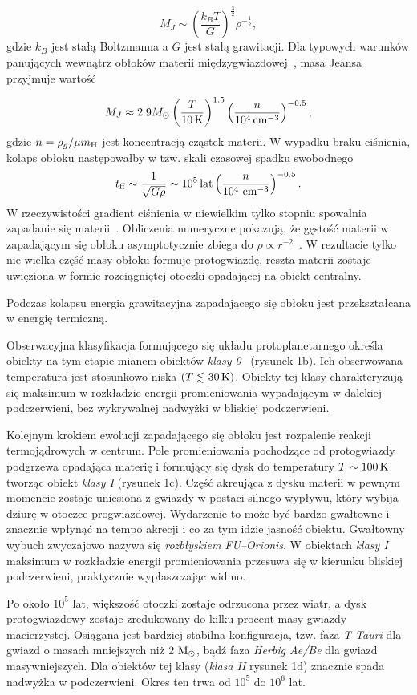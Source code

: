 \begin{equation} M_J \sim
   \left( \frac{k_B T}{G} \right) ^\frac{3}{2} {\rho}^{-\frac{1}{2}},
\end{equation} 
gdzie $k_B$ jest stałą Boltzmanna a $G$ jest stałą grawitacji.
Dla typowych warunków panujących wewnątrz obłoków materii
międzygwiazdowej~\cite{BM89}, masa Jeansa przyjmuje wartość

\begin{equation}
 M_J \approx 2.9 M_{\odot} \left(\frac{T}{10\hbox{$\thinspace\textrm{K}$}}\right)^{1.5} 
 \left(\frac{n}{10^4\hbox{$\thinspace\textrm{cm}$}^{-3}}\right)^{-0.5},
\end{equation}
gdzie $n = \rho_g / \mu \hbox{$m_{\textrm{H}}$}$ jest koncentracją cząstek materii.
W wypadku braku ciśnienia, kolaps obłoku następowałby w tzw. skali czasowej
spadku swobodnego~\cite{Spitzer1978}
\begin{equation}
   t_{\textrm{ff}} \sim \frac{1}{\sqrt{G\rho}} \sim 10^5\hbox{$\thinspace\textrm{lat}$}
   \left(\frac{n}{10^4\thinspace \hbox{$\thinspace\textrm{cm}$}^{-3}}\right)^{-0.5}.
\end{equation}
W rzeczywistości gradient ciśnienia w niewielkim tylko stopniu spowalnia
zapadanie się materii~\cite{T82}. Obliczenia numeryczne pokazują, że gęstość
materii w zapadającym się obłoku asymptotycznie zbiega do $\rho \propto
r^{-2}$~\cite{L69}. W rezultacie tylko nie wielka część masy obłoku formuje
protogwiazdę, reszta materii zostaje uwięziona w formie rozciągniętej otoczki
opadającej na obiekt centralny.

Podczas kolapsu energia grawitacyjna zapadającego się obłoku jest przekształcana
w energię termiczną.

Obserwacyjna klasyfikacja formującego się układu
protoplanetarnego określa obiekty na tym etapie mianem obiektów \emph{klasy
0}~\cite{andre} (rysunek 1b).  Ich obserwowana temperatura jest stosunkowo niska
$(T \lesssim 30\hbox{$\thinspace\textrm{K}$})$. Obiekty tej klasy charakteryzują się maksimum w rozkładzie
energii promieniowania wypadającym w dalekiej podczerwieni, bez wykrywalnej
nadwyżki w bliskiej podczerwieni. 

Kolejnym krokiem ewolucji zapadającego się
obłoku jest rozpalenie reakcji termojądrowych w centrum. Pole promieniowania
pochodzące od protogwiazdy podgrzewa opadająca materię i formujący się dysk do
temperatury $T \sim 100\hbox{$\thinspace\textrm{K}$}$ tworząc obiekt \emph{klasy I} (rysunek 1c).  Część
akreująca z dysku materii w pewnym momencie zostaje uniesiona z gwiazdy w
postaci silnego wypływu, który wybija dziurę w otoczce progwiazdowej. Wydarzenie
to może być bardzo gwałtowne i znacznie wpłynąć na tempo akrecji i co za tym
idzie jasność obiektu. Gwałtowny wybuch zwyczajowo nazywa się \emph{rozbłyskiem
FU--Orionis}.  W obiektach \emph{klasy I} maksimum w rozkładzie energii
promieniowania przesuwa się w kierunku bliskiej podczerwieni, praktycznie
wypłaszczając widmo.  \par Po około $10^5$ lat, większość otoczki zostaje
odrzucona przez wiatr, a dysk protogwiazdowy zostaje zredukowany do kilku
procent masy gwiazdy macierzystej.  Osiągana jest bardziej stabilna
konfiguracja, tzw. faza \emph{T-Tauri} dla gwiazd o masach mniejszych niż
$2\thinspace\hbox{$\mathrm{\thinspace M_{\odot}}$}$, bądź faza \emph{Herbig Ae/Be} dla gwiazd masywniejszych. Dla
obiektów tej klasy (\emph{klasa II} rysunek 1d) znacznie spada nadwyżka w
podczerwieni. Okres ten trwa od $10^5$ do $10^6$ lat.

